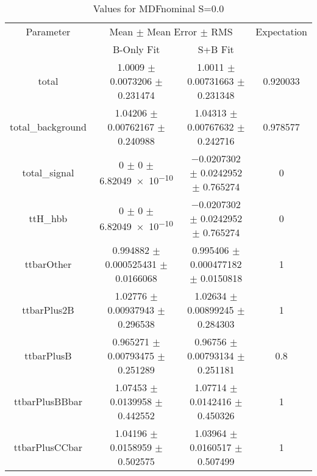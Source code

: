 \begin{table}
\centering
\caption{Values for MDFnominal S=0.0}
\begin{tabular}{cccc}
\toprule
Parameter & \multicolumn{2}{c}{Mean $\pm$ Mean Error $\pm$ RMS} & Expectation\\
 & B-Only Fit & S+B Fit & \\
\midrule
total & \num{1.0009} $\pm$ \num{0.0073206} $\pm$ \num{0.231474} & \num{1.0011} $\pm$ \num{0.00731663} $\pm$ \num{0.231348} & \num{0.920033}\\
total\_background & \num{1.04206} $\pm$ \num{0.00762167} $\pm$ \num{0.240988} & \num{1.04313} $\pm$ \num{0.00767632} $\pm$ \num{0.242716} & \num{0.978577}\\
total\_signal & \num{0} $\pm$ \num{0} $\pm$ \num{6.82049e-10} & \num{-0.0207302} $\pm$ \num{0.0242952} $\pm$ \num{0.765274} & \num{0}\\
ttH\_hbb & \num{0} $\pm$ \num{0} $\pm$ \num{6.82049e-10} & \num{-0.0207302} $\pm$ \num{0.0242952} $\pm$ \num{0.765274} & \num{0}\\
ttbarOther & \num{0.994882} $\pm$ \num{0.000525431} $\pm$ \num{0.0166068} & \num{0.995406} $\pm$ \num{0.000477182} $\pm$ \num{0.0150818} & \num{1}\\
ttbarPlus2B & \num{1.02776} $\pm$ \num{0.00937943} $\pm$ \num{0.296538} & \num{1.02634} $\pm$ \num{0.00899245} $\pm$ \num{0.284303} & \num{1}\\
ttbarPlusB & \num{0.965271} $\pm$ \num{0.00793475} $\pm$ \num{0.251289} & \num{0.96756} $\pm$ \num{0.00793134} $\pm$ \num{0.251181} & \num{0.8}\\
ttbarPlusBBbar & \num{1.07453} $\pm$ \num{0.0139958} $\pm$ \num{0.442552} & \num{1.07714} $\pm$ \num{0.0142416} $\pm$ \num{0.450326} & \num{1}\\
ttbarPlusCCbar & \num{1.04196} $\pm$ \num{0.0158959} $\pm$ \num{0.502575} & \num{1.03964} $\pm$ \num{0.0160517} $\pm$ \num{0.507499} & \num{1}\\
\bottomrule
\end{tabular}
\end{table}